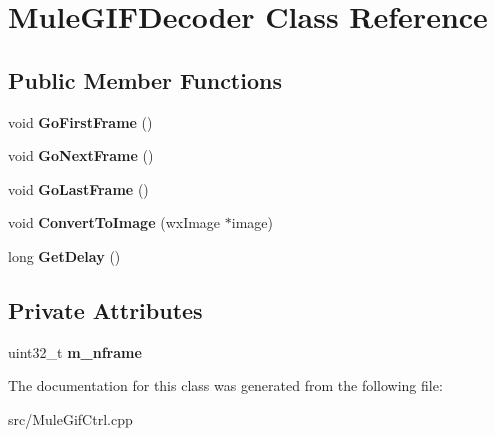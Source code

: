 \section{MuleGIFDecoder Class Reference}
\label{classMuleGIFDecoder}
\subsection*{Public Member Functions}
\begin{DoxyCompactItemize}
\item 
void {\bfseries GoFirstFrame} ()\label{classMuleGIFDecoder_ac89c65b1cd9bbea17c76214f2480115d}

\item 
void {\bfseries GoNextFrame} ()\label{classMuleGIFDecoder_abd8bb4610518d3b00e0fae222f06a4da}

\item 
void {\bfseries GoLastFrame} ()\label{classMuleGIFDecoder_a3b0ebe61682fbb0017fe03a4d2e4a523}

\item 
void {\bfseries ConvertToImage} (wxImage $\ast$image)\label{classMuleGIFDecoder_a99c6dade9588dd796b7f4de4d11c9f1c}

\item 
long {\bfseries GetDelay} ()\label{classMuleGIFDecoder_a4876c46a7f2a9010a3685d067646ccd6}

\end{DoxyCompactItemize}
\subsection*{Private Attributes}
\begin{DoxyCompactItemize}
\item 
uint32\_\-t {\bfseries m\_\-nframe}\label{classMuleGIFDecoder_ab63157f755d596e75bffc470ff3ed935}

\end{DoxyCompactItemize}


The documentation for this class was generated from the following file:\begin{DoxyCompactItemize}
\item 
src/MuleGifCtrl.cpp\end{DoxyCompactItemize}

